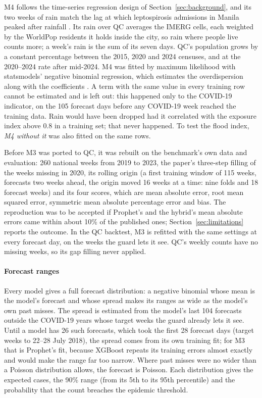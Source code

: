 M4 follows the time-series regression design of Section~\ref{sec:background}, and its two weeks
of rain match the lag at which leptospirosis admissions in Manila peaked after rainfall
\parencite{matsushita2018}. Its rain over QC averages the IMERG cells, each weighted by the
WorldPop residents it holds inside the city, so rain where people live counts more; a week's
rain is the sum of its seven days. QC's population grows by a constant percentage between the
2015, 2020 and 2024 censuses, and at the 2020--2024 rate after mid-2024. M4 was fitted by maximum
likelihood with statsmodels' negative binomial regression, which estimates the overdispersion
along with the coefficients \parencite{seabold2010}. A term with the same value in every training
row cannot be estimated and is left out: this happened only to the COVID-19 indicator, on the 105
forecast days before any COVID-19 week reached the training data. Rain would have been dropped
had it correlated with the exposure index above 0.8 in a training set; that never happened. To
test the flood index, \emph{M4 without it} was also fitted on the same rows.

Before M3 was ported to QC, it was rebuilt on the benchmark's own data and evaluation: 260 national
weeks from 2019 to 2023, the paper's three-step filling of the weeks missing in 2020, its rolling
origin (a first training window of 115 weeks, forecasts two weeks ahead, the origin moved 16 weeks
at a time: nine folds and 18 forecast weeks) and its four scores, which are mean absolute error,
root mean squared error, symmetric mean absolute percentage error and bias. The reproduction was
to be accepted if Prophet's and the hybrid's mean absolute errors came within about 10\% of the
published ones; Section~\ref{sec:limitations} reports the outcome. In the QC backtest, M3 is refitted with
the same settings at every forecast day, on the weeks the guard lets it see. QC's weekly counts
have no missing weeks, so its gap filling never applied.

\paragraph{Forecast ranges}
Every model gives a full forecast distribution: a negative binomial whose mean is the model's
forecast and whose spread makes its ranges as wide as the model's own past misses. The spread is
estimated from the model's last 104 forecasts outside the COVID-19 years whose target weeks the
guard already lets it see. Until a model has 26 such forecasts, which took the first 28 forecast
days (target weeks to 22--28 July 2018), the spread comes from its own training fit; for M3
that is Prophet's fit, because XGBoost repeats its training errors almost exactly and would make
the range far too narrow. Where past misses were no wider than a Poisson distribution allows, the
forecast is Poisson. Each distribution gives the expected cases, the 90\% range (from its 5th to
its 95th percentile) and the probability that the count breaches the epidemic threshold.

